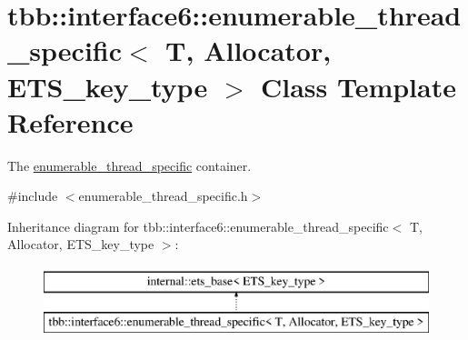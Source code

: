 \hypertarget{classtbb_1_1interface6_1_1enumerable__thread__specific}{}\section{tbb\+:\+:interface6\+:\+:enumerable\+\_\+thread\+\_\+specific$<$ T, Allocator, E\+T\+S\+\_\+key\+\_\+type $>$ Class Template Reference}
\label{classtbb_1_1interface6_1_1enumerable__thread__specific}


The \hyperlink{classtbb_1_1interface6_1_1enumerable__thread__specific}{enumerable\+\_\+thread\+\_\+specific} container.  




{\ttfamily \#include $<$enumerable\+\_\+thread\+\_\+specific.\+h$>$}

Inheritance diagram for tbb\+:\+:interface6\+:\+:enumerable\+\_\+thread\+\_\+specific$<$ T, Allocator, E\+T\+S\+\_\+key\+\_\+type $>$\+:\begin{figure}[H]
\begin{center}
\leavevmode
\includegraphics[height=2.000000cm]{classtbb_1_1interface6_1_1enumerable__thread__specific}
\end{center}
\end{figure}

